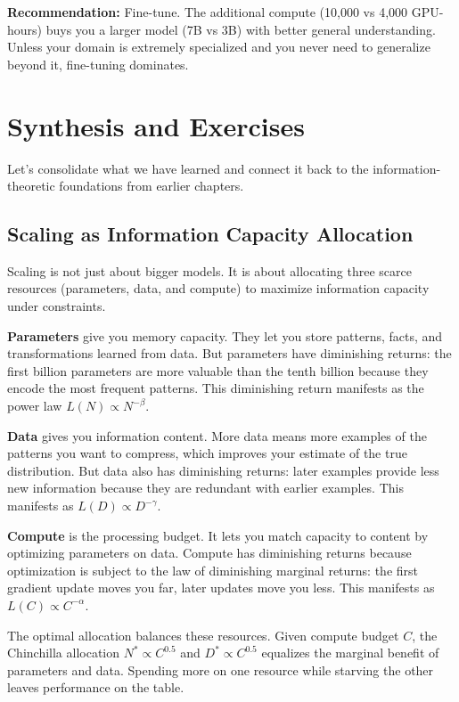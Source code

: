 \textbf{Recommendation:} Fine-tune. The additional compute (10,000 vs 4,000 GPU-hours) buys you a larger model (7B vs 3B) with better general understanding. Unless your domain is extremely specialized and you never need to generalize beyond it, fine-tuning dominates.

\vspace{2em}

\section{Synthesis and Exercises}

Let's consolidate what we have learned and connect it back to the information-theoretic foundations from earlier chapters.

\vspace{1em}

\subsection{Scaling as Information Capacity Allocation}

Scaling is not just about bigger models. It is about allocating three scarce resources (parameters, data, and compute) to maximize information capacity under constraints.

\textbf{Parameters} give you memory capacity. They let you store patterns, facts, and transformations learned from data. But parameters have diminishing returns: the first billion parameters are more valuable than the tenth billion because they encode the most frequent patterns. This diminishing return manifests as the power law $L(N) \propto N^{-\beta}$.

\textbf{Data} gives you information content. More data means more examples of the patterns you want to compress, which improves your estimate of the true distribution. But data also has diminishing returns: later examples provide less new information because they are redundant with earlier examples. This manifests as $L(D) \propto D^{-\gamma}$.

\textbf{Compute} is the processing budget. It lets you match capacity to content by optimizing parameters on data. Compute has diminishing returns because optimization is subject to the law of diminishing marginal returns: the first gradient update moves you far, later updates move you less. This manifests as $L(C) \propto C^{-\alpha}$.

The optimal allocation balances these resources. Given compute budget $C$, the Chinchilla allocation $N^* \propto C^{0.5}$ and $D^* \propto C^{0.5}$ equalizes the marginal benefit of parameters and data. Spending more on one resource while starving the other leaves performance on the table.


